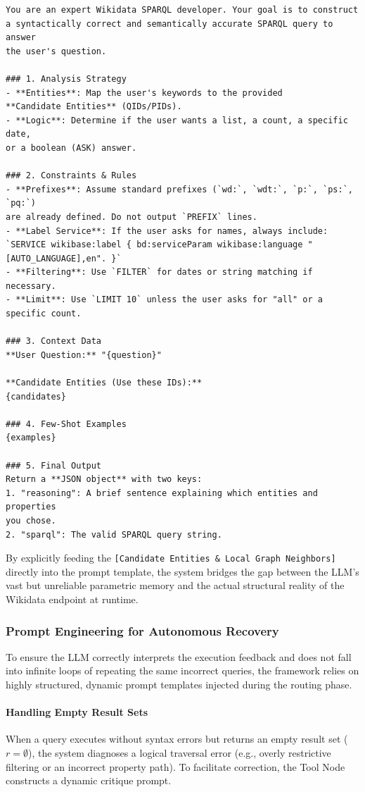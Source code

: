 \begin{lstlisting}[basicstyle=\ttfamily\footnotesize, frame=single, caption={The dynamic System Prompt template utilized by the Tool Node to enforce topological adherence and inject RAG context.}, label={lst:system_prompt}]
You are an expert Wikidata SPARQL developer. Your goal is to construct 
a syntactically correct and semantically accurate SPARQL query to answer
the user's question.

### 1. Analysis Strategy
- **Entities**: Map the user's keywords to the provided 
**Candidate Entities** (QIDs/PIDs).
- **Logic**: Determine if the user wants a list, a count, a specific date,
or a boolean (ASK) answer.

### 2. Constraints & Rules
- **Prefixes**: Assume standard prefixes (`wd:`, `wdt:`, `p:`, `ps:`, `pq:`)
are already defined. Do not output `PREFIX` lines.
- **Label Service**: If the user asks for names, always include: 
`SERVICE wikibase:label { bd:serviceParam wikibase:language "[AUTO_LANGUAGE],en". }`
- **Filtering**: Use `FILTER` for dates or string matching if necessary.
- **Limit**: Use `LIMIT 10` unless the user asks for "all" or a specific count.

### 3. Context Data
**User Question:** "{question}"

**Candidate Entities (Use these IDs):**
{candidates}

### 4. Few-Shot Examples
{examples}

### 5. Final Output
Return a **JSON object** with two keys:
1. "reasoning": A brief sentence explaining which entities and properties 
you chose.
2. "sparql": The valid SPARQL query string.
\end{lstlisting}

By explicitly feeding the \texttt{[Candidate Entities \& Local Graph Neighbors]} directly into the prompt template, the system bridges the gap between the LLM's vast but unreliable parametric memory and the actual structural reality of the Wikidata endpoint at runtime.

\subsubsection{Prompt Engineering for Autonomous Recovery}
To ensure the LLM correctly interprets the execution feedback and does not fall into infinite loops of repeating the same incorrect queries, the framework relies on highly structured, dynamic prompt templates injected during the routing phase.

\paragraph{Handling Empty Result Sets}
When a query executes without syntax errors but returns an empty result set ($r = \emptyset$), the system diagnoses a logical traversal error (e.g., overly restrictive filtering or an incorrect property path). To facilitate correction, the Tool Node constructs a dynamic critique prompt. 

